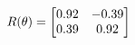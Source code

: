 \documentclass[preview]{standalone}
\begin{document}
\begin{align*}
\special{dvisvgm:raw <g id='unique000'>}R(\theta) = \begin{bmatrix}0.92 & -0.39\\0.39 & 0.92\end{bmatrix}\special{dvisvgm:raw </g>}
\end{align*}
\end{document}
